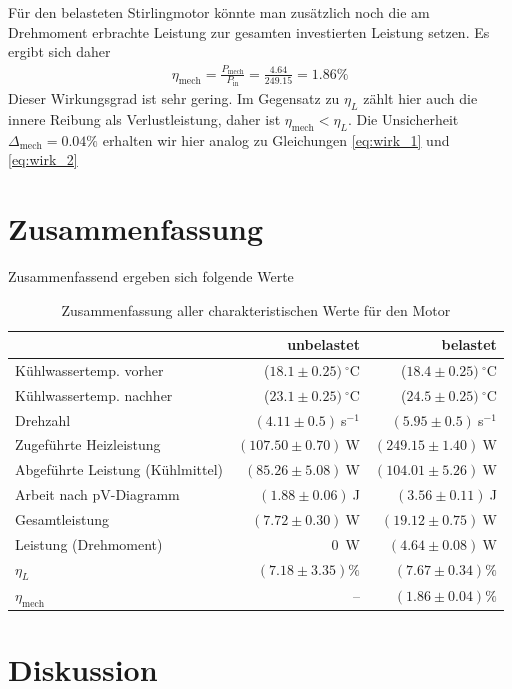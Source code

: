 \documentclass{article}
\begin{document}
Für den belasteten Stirlingmotor könnte man zusätzlich noch die am Drehmoment erbrachte Leistung zur gesamten investierten Leistung setzen.
Es ergibt sich daher
\begin{align*}
\eta_\text{mech} = \frac{P_\text{mech}}{P_\text{in}} = \frac{4.64}{249.15} = 1.86\%
\end{align*}
Dieser Wirkungsgrad ist sehr gering. Im Gegensatz zu $\eta_L$ zählt hier auch die innere Reibung als Verlustleistung, daher ist $\eta_\text{mech} < \eta_L$. Die Unsicherheit $\Delta_\text{mech} = 0.04\%$ erhalten wir hier analog zu Gleichungen \eqref{eq:wirk_1} und \eqref{eq:wirk_2}



\newpage
\section{Zusammenfassung}


Zusammenfassend ergeben sich folgende Werte 
\begin{table}[H]
\caption{Zusammenfassung aller charakteristischen Werte für den Motor}
\begin{tabular}{l|rr}
 & unbelastet & belastet \\
 \hline
Kühlwassertemp. vorher & ($18.1\pm 0.25)~{}^\circ$C & ($18.4\pm 0.25)~{}^\circ$C \\
Kühlwassertemp. nachher& ($23.1\pm 0.25)~{}^\circ$C & ($24.5\pm0.25)~{}^\circ$C \\
Drehzahl & $(4.11 \pm 0.5)~$s${}^{-1}$ & $(5.95 \pm 0.5)~$s${}^{-1}$ \\
Zugeführte Heizleistung & $(107.50 \pm 0.70)~$W & $(249.15 \pm 1.40)~$W \\
Abgeführte Leistung (Kühlmittel) & $(85.26 \pm 5.08)~$W & $(104.01 \pm 5.26)~$W\\
Arbeit nach pV-Diagramm & $(1.88 \pm 0.06)~$J & $(3.56 \pm 0.11)~$J \\
Gesamtleistung & $(7.72 \pm 0.30)~$W & $(19.12 \pm 0.75)~$W \\
Leistung (Drehmoment) & 0~W & $(4.64\pm 0.08)~$W \\
\hline
$\eta_L$ & $(7.18 \pm 3.35)\%$ & $(7.67 \pm 0.34)\%$ \\
$\eta_\text{mech}$ & -- & $(1.86 \pm 0.04)\%$
\end{tabular}
\end{table}

\section{Diskussion}
\end{document}
